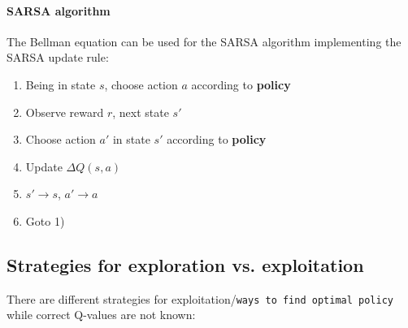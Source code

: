 \documentclass[11pt]{article}
\begin{document}
\paragraph{SARSA algorithm}
The Bellman equation can be used for the SARSA algorithm implementing the SARSA update rule:
\begin{enumerate}
	\item Being in state $s$, choose action $a$ according to \textbf{policy}
	\item Observe reward $r$, next state $s'$
	\item Choose action $a'$ in state $s'$ according to \textbf{policy}
	\item Update $\Delta Q(s,a)$
	\item $s' \rightarrow s$, $a' \rightarrow a$
	\item Goto 1)
\end{enumerate}

\subsection{Strategies for exploration vs. exploitation}
There are different strategies for exploitation/\texttt{ways to find optimal policy} while correct Q-values are not known:
\end{document}
